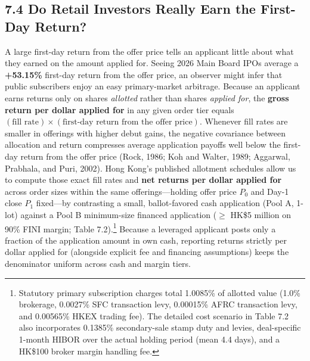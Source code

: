 \documentclass[11pt,letterpaper]{article}
\begin{document}
\subsection*{\texorpdfstring{7.4 Do Retail Investors Really Earn the First-Day Return?}{7.4 Do Retail Investors Really Earn the First-Day Return?}}
A large first-day return from the offer price tells an applicant little about what they earned on the amount applied for. Seeing 2026 Main Board IPOs average a \textbf{+53.15\%} first-day return from the offer price, an observer might infer that public subscribers enjoy an easy primary-market arbitrage. Because an applicant earns returns only on shares \textit{allotted} rather than shares \textit{applied for}, the \textbf{gross return per dollar applied for} in any given order tier equals $(\text{fill rate}) \times (\text{first-day return from the offer price})$. Whenever fill rates are smaller in offerings with higher debut gains, the negative covariance between allocation and return compresses average application payoffs well below the first-day return from the offer price (Rock, 1986; Koh and Walter, 1989; Aggarwal, Prabhala, and Puri, 2002). Hong Kong's published allotment schedules allow us to compute those exact fill rates and \textbf{net returns per dollar applied for} across order sizes within the same offerings—holding offer price $P_0$ and Day-1 close $P_1$ fixed—by contrasting a small, ballot-favored cash application (Pool A, 1-lot) against a Pool B minimum-size financed application ($\ge$ HK\$5 million on 90\% FINI margin; Table 7.2).\footnote{Statutory primary subscription charges total 1.0085\% of allotted value (1.0\% brokerage, 0.0027\% SFC transaction levy, 0.00015\% AFRC transaction levy, and 0.00565\% HKEX trading fee). The detailed cost scenario in Table 7.2 also incorporates 0.1385\% secondary-sale stamp duty and levies, deal-specific 1-month HIBOR over the actual holding period (mean 4.4 days), and a HK\$100 broker margin handling fee.} Because a leveraged applicant posts only a fraction of the application amount in own cash, reporting returns strictly per dollar applied for (alongside explicit fee and financing assumptions) keeps the denominator uniform across cash and margin tiers.
\end{document}
